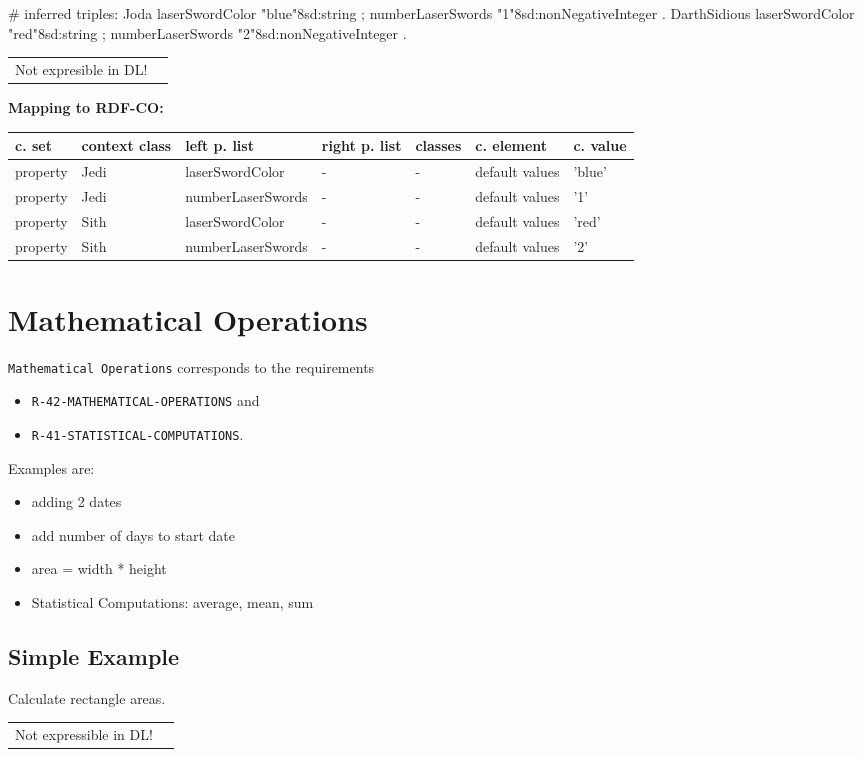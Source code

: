 \documentclass{llncs}
\newcommand{\ms}[1]{\texttt{#1}}
\newenvironment{gcotable}{
  \scriptsize
  \sffamily
  \vspace{0cm}
	\begin{center}
	\textbf{\vspace{0.4cm}Mapping to RDF-CO:} \\
  \begin{tabular}{l|l|l|l|l|l|l}
	\hline
  \textbf{c. set} & \textbf{context class} & \textbf{left p. list} & \textbf{right p. list} & \textbf{classes} & \textbf{c. element} & \textbf{c. value} \\
  \hline

}{
  \hline
  \end{tabular}
	\end{center}
}
\newenvironment{DL}{
\vspace{0cm}
	\begin{center}
  \begin{tabular}{r l}

}{
  \end{tabular}
	\end{center}
}
\begin{document}
\begin{ex}
# inferred triples:
Joda 
    laserSwordColor "blue"^^xsd:string ;
    numberLaserSwords "1"^^xsd:nonNegativeInteger .
DarthSidious 
    laserSwordColor "red"^^xsd:string ;
    numberLaserSwords "2"^^xsd:nonNegativeInteger .
\end{ex}

\begin{DL}
Not expresible in DL!
\end{DL}

\begin{gcotable}
property & Jedi & laserSwordColor & - & - & default values & 'blue' \\
property & Jedi & numberLaserSwords & - & - & default values & '1' \\
property & Sith & laserSwordColor & - & - & default values & 'red' \\
property & Sith & numberLaserSwords & - & - & default values & '2' \\
\end{gcotable}

\section{Mathematical Operations}

\ms{Mathematical Operations} corresponds to the requirements
\begin{itemize}
	\item \ms{R-42-MATHEMATICAL-OPERATIONS} and
  \item \ms{R-41-STATISTICAL-COMPUTATIONS}.
\end{itemize}
Examples are:
\begin{itemize}
	\item adding 2 dates
	\item add number of days to start date
	\item area = width * height
	\item Statistical Computations: average, mean, sum
\end{itemize}

\subsection{Simple Example}

Calculate rectangle areas.

\begin{DL}
Not expressible in DL!
\end{DL}
\end{document}
